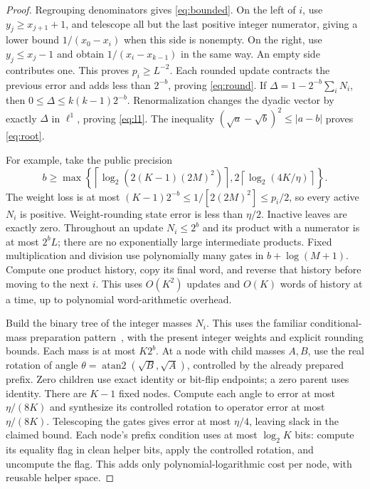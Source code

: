 \documentclass[11pt]{article}
\theoremstyle{definition}
\begin{document}
\begin{proof}
Regrouping denominators gives \eqref{eq:bounded}. On the left of $i$, use
$y_j\ge x_{j+1}+1$, and telescope all but the last positive integer
numerator, giving a lower bound $1/(x_0-x_i)$ when this side is nonempty.
On the right, use $y_j\le x_j-1$ and obtain $1/(x_i-x_{k-1})$ in the
same way. An empty side contributes one. This proves $p_i\ge L^{-2}$.
Each rounded update contracts the previous error and adds less than $2^{-b}$,
proving \eqref{eq:round}. If
$\Delta=1-2^{-b}\sum_iN_i$, then
$0\le\Delta\le k(k-1)2^{-b}$. Renormalization changes the dyadic vector
by exactly $\Delta$ in $\ell^1$, proving \eqref{eq:l1}.
The inequality $(\sqrt a-\sqrt b)^2\le|a-b|$ proves \eqref{eq:root}.

For example, take the public precision
\[
 b\ge\max\left\{\left\lceil\log_2(2(K-1)(2M)^2)\right\rceil,
             2\left\lceil\log_2(4K/\eta)\right\rceil\right\}.
\]
The weight loss is at most $(K-1)2^{-b}\le1/[2(2M)^2]\le p_i/2$,
so every active $N_i$ is positive. Weight-rounding state error is less
than $\eta/2$. Inactive leaves are exactly zero. Throughout an update
$N_i\le2^b$ and its product with a numerator is at most $2^bL$; there
are no exponentially large intermediate products. Fixed multiplication
and division use polynomially many gates in $b+\log(M+1)$. Compute one
product history, copy its final word, and reverse that history before
moving to the next $i$. This uses $O(K^2)$ updates and $O(K)$ words of
history at a time, up to polynomial word-arithmetic overhead.

Build the binary tree of the integer masses $N_i$. This uses the familiar
conditional-mass preparation pattern~\cite{gr}, with the present integer
weights and explicit rounding bounds. Each mass is at most
$K2^b$. At a node with child masses $A,B$, use the real rotation of angle
$\theta=\operatorname{atan2}(\sqrt B,\sqrt A)$, controlled by the already
prepared prefix. Zero children use exact identity or bit-flip endpoints;
a zero parent uses identity. There are $K-1$ fixed nodes. Compute each
angle to error at most $\eta/(8K)$ and synthesize its controlled rotation
to operator error at most $\eta/(8K)$. Telescoping the gates gives error
at most $\eta/4$, leaving slack in the claimed bound. Each node's prefix
condition uses at most $\log_2 K$ bits: compute its equality flag in clean
helper bits, apply the controlled rotation, and uncompute the flag. This
adds only polynomial-logarithmic cost per node, with reusable helper space.


\end{proof}
\end{document}
